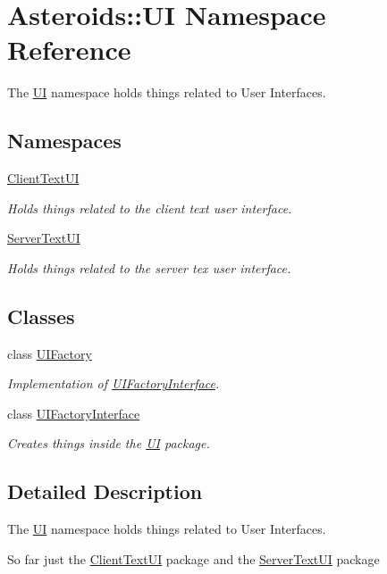 \hypertarget{namespaceAsteroids_1_1UI}{}\section{Asteroids\+:\+:UI Namespace Reference}
\label{namespaceAsteroids_1_1UI}


The \hyperlink{namespaceAsteroids_1_1UI}{UI} namespace holds things related to User Interfaces.  


\subsection*{Namespaces}
\begin{DoxyCompactItemize}
\item 
 \hyperlink{namespaceAsteroids_1_1UI_1_1ClientTextUI}{Client\+Text\+UI}
\begin{DoxyCompactList}\small\item\em Holds things related to the client text user interface. \end{DoxyCompactList}\item 
 \hyperlink{namespaceAsteroids_1_1UI_1_1ServerTextUI}{Server\+Text\+UI}
\begin{DoxyCompactList}\small\item\em Holds things related to the server tex user interface. \end{DoxyCompactList}\end{DoxyCompactItemize}
\subsection*{Classes}
\begin{DoxyCompactItemize}
\item 
class \hyperlink{classAsteroids_1_1UI_1_1UIFactory}{U\+I\+Factory}
\begin{DoxyCompactList}\small\item\em Implementation of \hyperlink{classAsteroids_1_1UI_1_1UIFactoryInterface}{U\+I\+Factory\+Interface}. \end{DoxyCompactList}\item 
class \hyperlink{classAsteroids_1_1UI_1_1UIFactoryInterface}{U\+I\+Factory\+Interface}
\begin{DoxyCompactList}\small\item\em Creates things inside the \hyperlink{namespaceAsteroids_1_1UI}{UI} package. \end{DoxyCompactList}\end{DoxyCompactItemize}


\subsection{Detailed Description}
The \hyperlink{namespaceAsteroids_1_1UI}{UI} namespace holds things related to User Interfaces. 

So far just the \hyperlink{namespaceAsteroids_1_1UI_1_1ClientTextUI}{Client\+Text\+UI} package and the \hyperlink{namespaceAsteroids_1_1UI_1_1ServerTextUI}{Server\+Text\+UI} package 